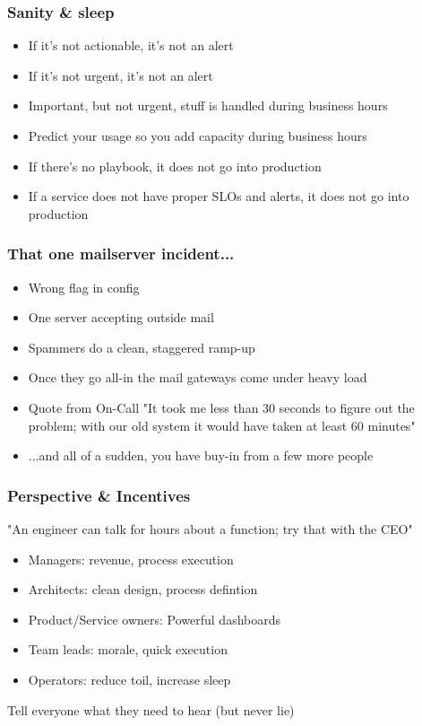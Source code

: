 \documentclass[t]{beamer}
\begin{document}
\begin{frame}
	\frametitle{Sanity \& sleep}
	\begin{itemize}
		\item If it's not actionable, it's not an alert
		\item If it's not urgent, it's not an alert
		\item Important, but not urgent, stuff is handled during business hours
		\item Predict your usage so you add capacity during business hours
		\item If there's no playbook, it does not go into production
		\item If a service does not have proper SLOs and alerts, it does not go into production
	\end{itemize}
\end{frame}

\begin{frame}
	\frametitle{That one mailserver incident...}
	\begin{itemize}
		\item Wrong flag in config
		\item One server accepting outside mail
		\item Spammers do a clean, staggered ramp-up
		\item Once they go all-in the mail gateways come under heavy load
		\item Quote from On-Call "It took me less than 30 seconds to figure out the problem; with our old system it would have taken at least 60 minutes"
		\item ...and all of a sudden, you have buy-in from a few more people
	\end{itemize}
\end{frame}

\begin{frame}
	\frametitle{Perspective \& Incentives}
	"An engineer can talk for hours about a function; try that with the CEO"
	\vfill
	\begin{itemize}
		\item Managers: revenue, process execution
		\item Architects: clean design, process defintion
		\item Product/Service owners: Powerful dashboards
		\item Team leads: morale, quick execution
		\item Operators: reduce toil, increase sleep
	\end{itemize}
	\vfill
	Tell everyone what they need to hear (but never lie)
	\vfill
\end{frame}
\end{document}
